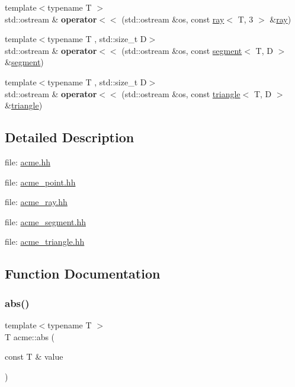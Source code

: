 \begin{DoxyCompactItemize}
\item 
\mbox{\label{namespaceacme_a8e4c4c5a2909a07c6be7cd9b341bfd6a}} 
{\footnotesize template$<$typename T $>$ }\\std\+::ostream \& {\bfseries operator$<$$<$} (std\+::ostream \&os, const \hyperlink{classacme_1_1ray}{ray}$<$ T, 3 $>$ \&\hyperlink{classacme_1_1ray}{ray})
\item 
\mbox{\label{namespaceacme_a57a1dda522f330fb40bb206dce427297}} 
{\footnotesize template$<$typename T , std\+::size\+\_\+t D$>$ }\\std\+::ostream \& {\bfseries operator$<$$<$} (std\+::ostream \&os, const \hyperlink{classacme_1_1segment}{segment}$<$ T, D $>$ \&\hyperlink{classacme_1_1segment}{segment})
\item 
\mbox{\label{namespaceacme_a9e0b4489892523ceac270a9d7c8b932e}} 
{\footnotesize template$<$typename T , std\+::size\+\_\+t D$>$ }\\std\+::ostream \& {\bfseries operator$<$$<$} (std\+::ostream \&os, const \hyperlink{classacme_1_1triangle}{triangle}$<$ T, D $>$ \&\hyperlink{classacme_1_1triangle}{triangle})
\end{DoxyCompactItemize}


\subsection{Detailed Description}
file\+: \hyperlink{acme_8hh_source}{acme.\+hh}

file\+: \hyperlink{acme__point_8hh_source}{acme\+\_\+point.\+hh}

file\+: \hyperlink{acme__ray_8hh_source}{acme\+\_\+ray.\+hh}

file\+: \hyperlink{acme__segment_8hh_source}{acme\+\_\+segment.\+hh}

file\+: \hyperlink{acme__triangle_8hh_source}{acme\+\_\+triangle.\+hh} 

\subsection{Function Documentation}
\mbox{\label{namespaceacme_add7b88267b101300f6818a0ed6dacf2a}} 
\subsubsection{\texorpdfstring{abs()}{abs()}}
{\footnotesize\ttfamily template$<$typename T $>$ \\
T acme\+::abs (\begin{DoxyParamCaption}\item[{const T \&}]{value }\end{DoxyParamCaption})\hspace{0.3cm}{\ttfamily [inline]}}



